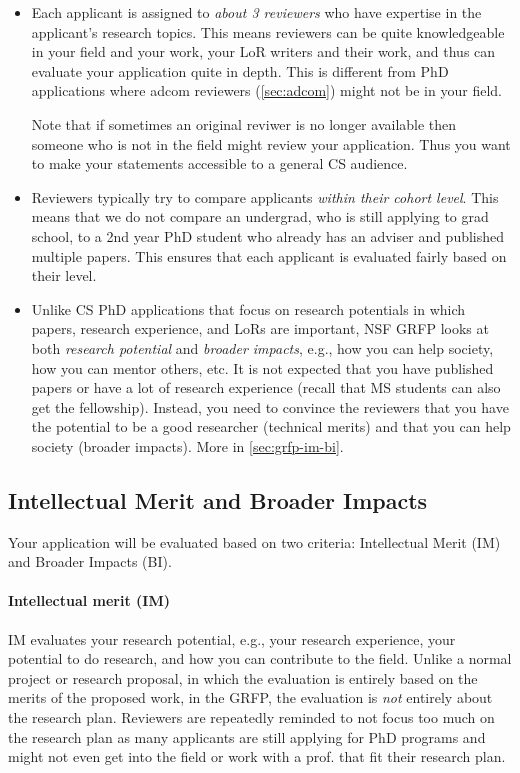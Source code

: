 \documentclass[oneside,11pt,dvipsnames]{book}
\begin{document}
\begin{itemize}
\item Each applicant is assigned to \emph{about 3 reviewers} who have expertise in the applicant's research topics. This means reviewers can be quite knowledgeable in your field and your work, your LoR writers and their work, and thus can evaluate your application quite in depth. This is different from PhD applications where adcom reviewers (\autoref{sec:adcom}) might not be in your field.

Note that if sometimes an original reviwer is no longer available then someone who is not in the field might review your application.  Thus you want to make your statements accessible to a general CS audience.

\item Reviewers typically try to compare applicants \emph{within their cohort level}.  This means that we do not compare an undergrad, who is still applying to grad school, to a 2nd year PhD student who already has an adviser and published multiple papers. This ensures that each applicant is evaluated fairly based on their level.

\item Unlike CS PhD applications that focus on research potentials in which papers, research experience, and LoRs are important, NSF GRFP looks at both \emph{research potential} and \emph{broader impacts}, e.g., how you can help society, how you can mentor others, etc.  It is not expected that you have published papers or have a lot of research experience (recall that MS students can also get the fellowship). Instead, you need to convince the reviewers that you have the potential to be a good researcher (technical merits) and that you can help society (broader impacts). More in \autoref{sec:grfp-im-bi}. 

\end{itemize}


\subsection{Intellectual Merit and Broader Impacts}\label{sec:grfp-im-bi}

Your application will be evaluated based on two criteria: Intellectual Merit (IM) and Broader Impacts (BI). 

\paragraph{Intellectual merit (IM)} IM evaluates your research potential, e.g., your research experience, your potential to do research, and how you can contribute to the field.   Unlike a normal project or research proposal, in which the evaluation is entirely based on the merits of the proposed work, in the GRFP, the evaluation is \emph{not} entirely about the research plan. Reviewers are repeatedly reminded to not focus too much on the research plan as many applicants are still applying for PhD programs and might not even get into the field or work with a prof. that fit their research plan. 
\end{document}
